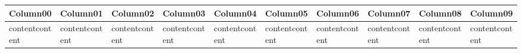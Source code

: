 \documentclass{article}
\begin{document}
\begin{longtable}{@{}llllllllll@{}}
\toprule
Column00 & Column01 & Column02 & Column03 & Column04 & Column05 & Column06 & Column07 & Column08 & Column09 \\
\midrule
\endhead
contentcontent & contentcontent & contentcontent & contentcontent & contentcontent & contentcontent & contentcontent & contentcontent & contentcontent & contentcontent \\
\bottomrule
\end{longtable}
\end{document}
